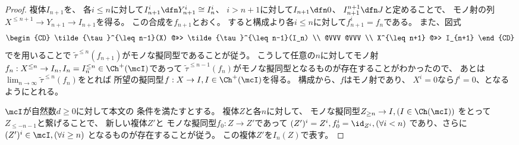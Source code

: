 \documentclass[uplatex,dvipdfmx]{jsarticle}
\begin{document}
\begin{proof}
  複体\(I_{n+1}\)を、
  各\(i\leq n\)に対して\(I_{n+1}^i \dfn Y_{n+1}^i \cong I_n^i\)、
  \(i > n+1\)に対して\(I_{n+1}\dfn 0\)、
  \(I_{n+1}^{n+1} \dfn J\)と定めることで、
  モノ射の列\(X^{\leq n+1}\to Y_{n+1} \to I_{n+1}\)を得る。
  この合成を\(f_{n+1}\)とおく。
  すると構成より各\(i\leq n\)に対して\(f_{n+1}^i = f_n\)である。
  また、図式
  \[
  \begin{CD}
    \tilde{\tau}^{\leq n-1}(X) @>>> \tilde{\tau}^{\leq n-1}(I_n) \\
    @VVV @VVV \\
    X^{\leq n+1} @>>> I_{n+1}
  \end{CD}
  \]
  でを用いることで
  \(\tilde{\tau}^{\leq n}(f_{n+1})\)がモノな擬同型であることが従う。
  こうして任意の\(n\)に対してモノ射
  \(f_n:X^{\leq n}\to I_n, I_n=I_n^{\leq n} \in \Ch^+(\mcI)\)であって
  \(\tilde{\tau}^{\leq n-1}(f_n)\)がモノな擬同型となるものが存在することがわかったので、
  あとは\(\lim_{n\to \infty}\tilde{\tau}^{\leq n}(f_n)\)をとれば
  所望の擬同型\(f:X\to I, I\in \Ch^+(\mcI)\)を得る。
  構成から、\(f\)はモノ射であり、
  \(X^i = 0\)なら\(f^i = 0\)、となるようにとれる。

  \(\mcI\)が自然数\(d\geq 0\)に対して本文の
  条件\cite[(1.7.6)]{kashiwara2002sheaves}を満たすとする。
  複体\(Z\)と各\(n\)に対して、
  モノな擬同型\(Z_{\geq n}\to I, (I\in \Ch(\mcI))\)
  をとって\(Z_{\leq -n-1}\)と繋げることで、
  新しい複体\(Z'\)と
  モノな擬同型\(f_0:Z\to Z'\)であって
  \((Z')^i=Z^i,f_0^i = \id_{Z^i},(\forall i < n)\)
  であり、さらに\((Z')^i\in \mcI, (\forall i \geq n)\)
  となるものが存在することが従う。
  この複体\(Z'\)を\(I_n(Z)\)で表す。


\end{proof}
\end{document}
